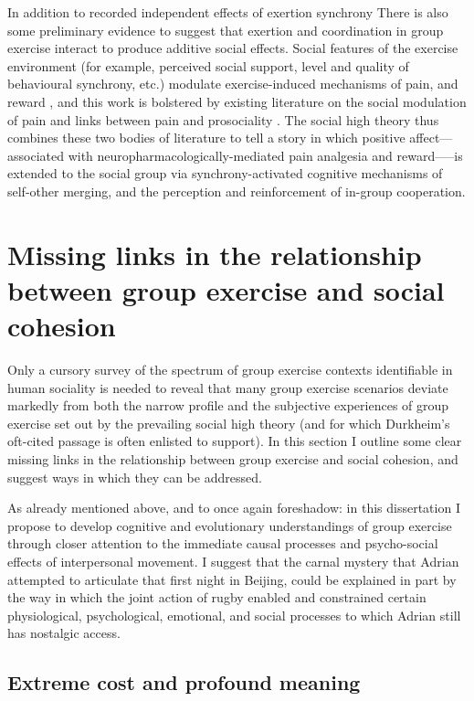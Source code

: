 \begin{CJK}{UTF8}{gbsn}
In addition to recorded independent effects of exertion synchrony There is also some preliminary evidence to suggest that exertion and coordination in group exercise interact to produce additive social effects.  Social features of the exercise environment (for example, perceived social support, level and quality of behavioural synchrony, etc.) modulate exercise-induced mechanisms of pain, and reward \citep{Cohen2009,Sullivan2014,Tarr2015,Davis2015,Weinstein2016}, and this work is bolstered by existing literature on the social modulation of pain \citep{Eisenberger2012a} and links between pain and prosociality \citep{Bastian2014a}.  The social high theory thus combines these two bodies of literature to tell a story in which positive affect---associated with neuropharmacologically-mediated pain analgesia and reward—--is extended to the social group via synchrony-activated cognitive mechanisms of self-other merging, and the perception and reinforcement of in-group cooperation.

\section{Missing links in the relationship between group exercise and social cohesion\label{sect:missingLinks}}
Only a cursory survey of the spectrum of group exercise contexts identifiable in human sociality is needed to reveal that many group exercise scenarios deviate markedly from both the narrow profile and the subjective experiences of group exercise set out by the prevailing social high theory (and for which Durkheim's oft-cited passage is often enlisted to support). In this section I outline some clear missing links in the relationship between group exercise and social cohesion, and suggest ways in which they can be addressed.

As already mentioned above, and to once again foreshadow: in this dissertation I propose to develop cognitive and evolutionary understandings of group exercise through closer attention to the immediate causal processes and psycho-social effects of interpersonal movement.  I suggest that the carnal mystery that Adrian attempted to articulate that first night in Beijing, could be explained in part by the way in which the joint action of rugby enabled and constrained certain physiological, psychological, emotional, and social processes to which Adrian still has nostalgic access.


\subsection{Extreme cost and profound meaning\label{sect:linkCostMeaning}}


\end{CJK}
